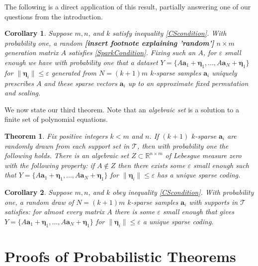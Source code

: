 \documentclass[journal, onecolumn]{IEEEtran}
\newtheorem{theorem}{Theorem}
\newtheorem{corollary}{Corollary}
\begin{document}
The following is a direct application of this result, partially answering one of our questions from the introduction.

\begin{corollary}
Suppose $m, n$, and $k$ satisfy inequality \eqref{CScondition}. With probability one, a random \textbf{[insert footnote explaining 'random']} $n \times m$ generation matrix $A$ satisfies \eqref{SparkCondition}. Fixing   such an $A$, for $\varepsilon$ small enough we have with probability one that a dataset $Y = \{A\mathbf{a}_1 + \mathbf{\eta}_1, . . . , A\mathbf{a}_N + \mathbf{\eta}_1 \}$ for $\|\mathbf{\eta}_i\| \leq \varepsilon$ generated from $N = (k + 1)m$ $k$-sparse samples $\mathbf{a}_i$ uniquely prescribes $A$ and these sparse vectors $\mathbf{a}_i$ up to an approximate fixed permutation and scaling.
\end{corollary}

We now state our third theorem. Note that an \emph{algebraic set} is a solution to a finite set of polynomial equations. 

\begin{theorem}\label{Theorem3}
Fix positive integers $k < m$ and $n$. If $(k + 1)$ $k$-sparse $\mathbf{a}_i$ are randomly drawn from each support set in $\mathcal{T}$, then with probability one the following holds. There is an algebraic set $Z \subset \mathbb{R}^{n \times m}$ of Lebesgue measure zero with the following property: if $A \notin Z$ then there exists some $\varepsilon$ small enough such that $Y = \{A\mathbf{a}_1 + \mathbf{\eta}_1, . . . , A\mathbf{a}_N + \mathbf{\eta}_1 \}$ for $\|\mathbf{\eta}_i\| \leq \varepsilon$ has a unique sparse coding.
\end{theorem}

\begin{corollary}
Suppose $m, n$, and $k$ obey inequality \eqref{CScondition}. With probability one, a random draw of $N = (k + 1)m$ $k$-sparse samples $\mathbf{a}_i$ with supports in $\mathcal{T}$ satisfies: for almost every matrix $A$ there is some $\varepsilon$ small enough that gives $Y = \{A\mathbf{a}_1 + \mathbf{\eta}_1, . . . , A\mathbf{a}_N + \mathbf{\eta}_1 \}$ for $\|\mathbf{\eta}_i\| \leq \varepsilon$ a unique sparse coding.
\end{corollary}


\section{Proofs of Probabilistic Theorems}\label{PUTproof}
\end{document}

